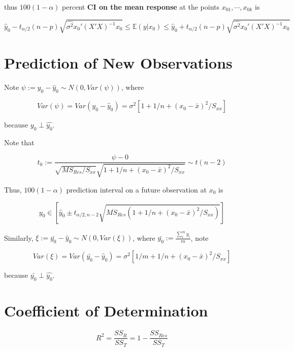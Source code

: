 \documentclass[12pt]{article}
\begin{document}
thus $100(1-\alpha)$ percent \textbf{CI on the mean response} at the points $x_{01}, \cdots, x_{0k}$ is 

$$
\hat{y}_0 - t_{\alpha/2} (n-p) \sqrt{ \hat{\sigma^2} x_0' (X'X)^{-1} x_0} \le \mathbb{E}(y | x_0) \le \hat{y}_0 + t_{\alpha/2} (n-p) \sqrt{ \hat{\sigma^2} x_0' (X'X)^{-1} x_0}
$$ 


\pagebreak

\section{Prediction of New Observations}

Note $\psi := y_0 - \hat{y}_0 \sim N\left(0, Var(\psi) \right)$, where

$$
Var(\psi) = Var(y_0 - \hat{y}_0) = \sigma^2 \left[ 1 + 1/n + (x_0 - \bar{x})^2/S_{xx} \right]
$$

because $y_0 \perp \hat{y_0}$. 


Note that 

$$
t_0 := \frac{\psi - 0}{\sqrt{MS_{Res}/S_{xx}} \sqrt{1 + 1/n + (x_0 - \bar{x})^2/S_{xx}} } \sim t(n-2)
$$

Thus, $100(1-\alpha)$ prediction interval on a future observation at $x_0$ is 

$$
y_0 \in \left[\hat{y}_0 \pm t_{\alpha/2, n-2} \sqrt{MS_{Res} \left( 1 + 1/n + (x_0 - \bar{x})^2/S_{xx}\right)} \right]
$$


Similarly, $\xi := \bar{y_0} - \hat{y}_0 \sim N\left(0, Var(\xi) \right)$, where $\bar{y_0} := \frac{\sum_i^m y_i}{m}$, note

$$
Var(\xi) = Var(\bar{y_0}- \hat{y}_0) = \sigma^2 \left[ 1/m + 1/n + (x_0 - \bar{x})^2/S_{xx} \right]
$$

because $\bar{y_0} \perp \hat{y_0}$. 


\pagebreak

\section{Coefficient of Determination}


$$
R^2 = \frac{SS_R}{SS_T} = 1 - \frac{SS_{Res}}{SS_T}
$$
\end{document}
